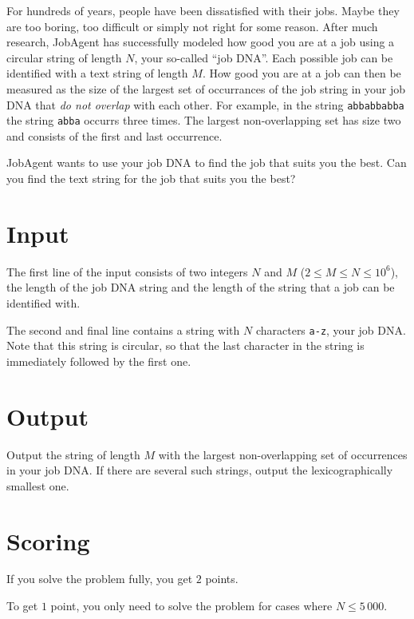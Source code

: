 For hundreds of years, people have been dissatisfied with their jobs.
Maybe they are too boring, too difficult or simply not right for some reason.
After much research, JobAgent has successfully modeled how good you are at a job using a circular string of length $N$, your so-called ``job DNA''.
Each possible job can be identified with a text string of length $M$.
How good you are at a job can then be measured as the size of the largest set of occurrances of the job string in your job DNA that \emph{do not overlap} with each other.
For example, in the string \texttt{abbabbabba} the string \texttt{abba} occurrs three times.
The largest non-overlapping set has size two and consists of the first and last occurrence.

JobAgent wants to use your job DNA to find the job that suits you the best.
Can you find the text string for the job that suits you the best?

\section*{Input}
The first line of the input consists of two integers $N$ and $M$ ($2 \le M \le N \le 10^6$), the length of the job DNA string and the length of the string that a job can be identified with.

The second and final line contains a string with $N$ characters \texttt{a-z}, your job DNA.
Note that this string is circular, so that the last character in the string is immediately followed by the first one.

\section*{Output}
Output the string of length $M$ with the largest non-overlapping set of occurrences in your job DNA.
If there are several such strings, output the lexicographically smallest one.

\section*{Scoring}
If you solve the problem fully, you get $2$ points.

To get $1$ point, you only need to solve the problem for cases where $N \le 5\,000$.
